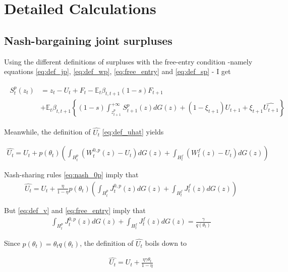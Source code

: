 
\section{Detailed Calculations}

\subsection{Nash-bargaining joint surpluses}
\label{sec:nb_surplus}

Using the different definitions of surpluses with the free-entry condition -namely equations \eqref{eq:def_jp}, \eqref{eq:def_wp}, \eqref{eq:free_entry} and \eqref{eq:def_sp} - I get

\begin{align} \label{eq:sp_appendix}
\begin{split}
S_t^p \left( z_t \right) &= z_t - U_t + F_t - \mathbb{E}_t \beta_{t,t+1} (1-s) F_{t+1}\\
&+ \mathbb{E}_t  \beta_{t,t+1} \left\{ (1-s)\int_{z_{t+1}^p}^{+\infty} S_{t+1}^p (z) dG(z) + \left(1-\xi_{t+1}\right) U_{t+1} + \xi_{t+1} \widehat{U_{t+1}}\right\}
\end{split}
\end{align}

Meanwhile, the definition of $\widehat{U_t}$ \eqref{eq:def_uhat} yields

\begin{align}
\widehat{U_t} = U_t + p\left(\theta_t \right) \left( \int_{H_t^p} \left( W_t^{0,p} (z) - U_t \right) dG(z) + \int_{H_t^f} \left( W_t^{f} (z) - U_t \right) dG(z) \right)
\end{align}

Nash-sharing rules \eqref{eq:nash_0p} imply that
\begin{align}
\widehat{U_t} = U_t + \frac{\eta}{1-\eta} p\left(\theta_t \right) \left( \int_{H_t^p} J_t^{0,p} (z) dG(z) + \int_{H_t^f} J_t^f (z) dG(z) \right)
\end{align}

But \eqref{eq:def_v} and \eqref{eq:free_entry} imply that
\begin{align}
\int_{H_t^p} J_t^{0,p} (z) dG(z) + \int_{H_t^f} J_t^f (z) dG(z) = \frac{\gamma}{q\left( \theta_t \right)}
\end{align}

Since $p \left( \theta_t \right) = \theta_t q \left( \theta_t \right)$, the definition of $\widehat{U_t}$ boils down to

\begin{align}
\widehat{U_t} = U_t + \frac{\eta \gamma \theta_t}{1-\eta} \label{eq:nash_uhat}
\end{align}

